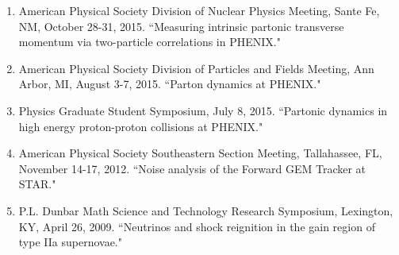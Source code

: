 \documentclass[11pt]{article}
\begin{document}
\begin{flushleft}
\begin{enumerate}
		\item American Physical Society Division of Nuclear Physics Meeting, Sante Fe, NM, October 28-31, 2015. ``Measuring intrinsic partonic transverse momentum via two-particle correlations in PHENIX."
		
		\item American Physical Society Division of Particles and Fields Meeting, Ann Arbor, MI, August 3-7, 2015. ``Parton dynamics at PHENIX." 
		
		\item Physics Graduate Student Symposium, July 8, 2015.  ``Partonic dynamics in high energy proton-proton collisions at PHENIX." 
		
		\item American Physical Society Southeastern Section Meeting, Tallahassee, FL, November 14-17, 2012.  ``Noise analysis of the Forward GEM Tracker at STAR." 
		
		\item P.L. Dunbar Math Science and Technology Research Symposium, Lexington, KY, April 26, 2009. ``Neutrinos and shock reignition in the gain region of type IIa supernovae."
	\end{enumerate}
	
\end{flushleft}

\vspace{7pt}




\end{document}
